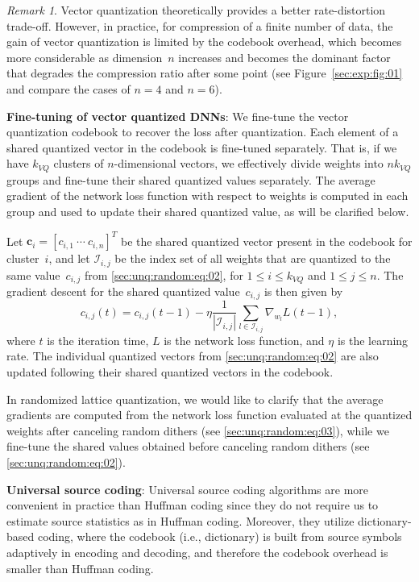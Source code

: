 \documentclass{article}
\theoremstyle{remark}
\newtheorem{remark}{Remark}
\begin{document}
\begin{remark} \label{sec:unq:remark:01}
Vector quantization theoretically provides a better rate-distortion trade-off. However, in practice, for compression of a finite number of data, the gain of vector quantization is limited by the codebook overhead, which becomes more considerable as dimension~$n$ increases and becomes the dominant factor that degrades the compression ratio after some point (see Figure~\ref{sec:exp:fig:01} and compare the cases of $n=4$ and $n=6$).
\end{remark}

\textbf{Fine-tuning of vector quantized DNNs}: We fine-tune the vector quantization codebook to recover the loss after quantization. Each element of a shared quantized vector in the codebook is fine-tuned separately. That is, if we have $k_\textit{VQ}$ clusters of $n$-dimensional vectors, we effectively divide weights into $nk_\textit{VQ}$ groups and fine-tune their shared quantized values separately. The average gradient of the network loss function with respect to weights is computed in each group and used to update their shared quantized value, as will be clarified below.

Let $\mathbf{c}_i=[c_{i,1}\ \cdots\ c_{i,n}]^T$ be the shared quantized vector present in the codebook for cluster~$i$, and let $\mathcal{I}_{i,j}$ be the index set of all weights that are quantized to the same value~$c_{i,j}$ from \eqref{sec:unq:random:eq:02}, for $1\leq i\leq k_\textit{VQ}$ and $1\leq j\leq n$. The gradient descent for the shared quantized value~$c_{i,j}$ is then given by
\begin{equation}
c_{i,j}(t)
=c_{i,j}(t-1)-\eta\frac{1}{|\mathcal{I}_{i,j}|}\sum_{l\in\mathcal{I}_{i,j}}\nabla_{w_l}L(t-1),
\end{equation}
where $t$ is the iteration time, $L$ is the network loss function, and $\eta$ is the learning rate. The individual quantized vectors from \eqref{sec:unq:random:eq:02} are also updated following their shared quantized vectors in the codebook.

In randomized lattice quantization, we would like to clarify that the average gradients are computed from the network loss function evaluated at the quantized weights after canceling random dithers (see \eqref{sec:unq:random:eq:03}), while we fine-tune the shared values obtained before canceling random dithers (see \eqref{sec:unq:random:eq:02}).

\textbf{Universal source coding}: Universal source coding algorithms are more convenient in practice than Huffman coding since they do not require us to estimate source statistics as in Huffman coding. Moreover, they utilize dictionary-based coding, where the codebook (i.e., dictionary) is built from source symbols adaptively in encoding and decoding, and therefore the codebook overhead is smaller than Huffman coding.%
\end{document}
